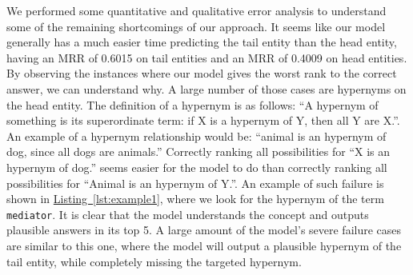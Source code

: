 \documentclass[11pt,a4paper]{article}
\newcommand{\RefListing}[1]{\hyperref[#1]{Listing~\ref{#1}}}
\begin{document}
We performed some quantitative and qualitative error analysis to understand some of the remaining shortcomings of our approach.
It seems like our model generally has a much easier time predicting the tail entity than the head entity, having an MRR of 0.6015 on tail entities and an MRR of 0.4009 on head entities.
By observing the instances where our model gives the worst rank to the correct answer, we can understand why.
A large number of those cases are hypernyms on the head entity.
The definition of a hypernym is as follows: ``A hypernym of something is its superordinate term: if X is a hypernym of Y, then all Y are X.''.
An example of a hypernym relationship would be: ``animal is an hypernym of dog, since all dogs are animals.''
Correctly ranking all possibilities for ``X is an hypernym of dog.'' seems easier for the model to do than correctly ranking all possibilities for ``Animal is an hypernym of Y.''.
An example of such failure is shown in \RefListing{lst:example1}, where we look for the hypernym of the term \texttt{mediator}.
It is clear that the model understands the concept and outputs plausible answers in its top 5.
A large amount of the model's severe failure cases are similar to this one, where the model will output a plausible hypernym of the tail entity, while completely missing the targeted hypernym.
\end{document}

